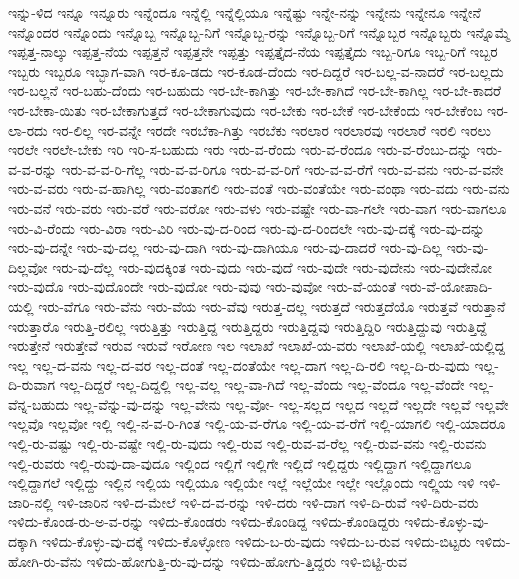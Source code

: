 {ಇನ್ನು-ಳಿದ
ಇನ್ನೂ
ಇನ್ನೂರು
ಇನ್ನೆಂದೂ
ಇನ್ನೆಲ್ಲಿ
ಇನ್ನೆಲ್ಲಿಯೂ
ಇನ್ನೆಷ್ಟು
ಇನ್ನೇ-ನನ್ನು
ಇನ್ನೇನು
ಇನ್ನೇನೂ
ಇನ್ನೇನೆ
ಇನ್ನೊಂದರ
ಇನ್ನೊಂದು
ಇನ್ನೊಬ್ಬ
ಇನ್ನೊಬ್ಬ-ನಿಗೆ
ಇನ್ನೊಬ್ಬ-ರನ್ನು
ಇನ್ನೊಬ್ಬ-ರಿಗೆ
ಇನ್ನೊಬ್ಬರ
ಇನ್ನೊಬ್ಬರು
ಇನ್ನೊಮ್ಮೆ
ಇಪ್ಪತ್ತ-ನಾಲ್ಕು
ಇಪ್ಪತ್ತ-ನೆಯ
ಇಪ್ಪತ್ತನೆ
ಇಪ್ಪತ್ತನೇ
ಇಪ್ಪತ್ತು
ಇಪ್ಪತ್ತೈದ-ನೆಯ
ಇಪ್ಪತ್ತೈದು
ಇಬ್ಬ-ರಿಗೂ
ಇಬ್ಬ-ರಿಗೆ
ಇಬ್ಬರ
ಇಬ್ಬರು
ಇಬ್ಬರೂ
ಇಬ್ಭಾಗ-ವಾಗಿ
ಇರ-ಕೂ-ಡದು
ಇರ-ಕೂಡ-ದೆಂದು
ಇರ-ದಿದ್ದರೆ
ಇರ-ಬಲ್ಲ-ವ-ನಾದರೆ
ಇರ-ಬಲ್ಲದು
ಇರ-ಬಲ್ಲನೆ
ಇರ-ಬಹು-ದೆಂದು
ಇರ-ಬಹುದು
ಇರ-ಬೇ-ಕಾಗಿತ್ತು
ಇರ-ಬೇ-ಕಾಗಿದೆ
ಇರ-ಬೇ-ಕಾಗಿಲ್ಲ
ಇರ-ಬೇ-ಕಾದರೆ
ಇರ-ಬೇಕಾ-ಯಿತು
ಇರ-ಬೇಕಾಗುತ್ತದೆ
ಇರ-ಬೇಕಾಗುವುದು
ಇರ-ಬೇಕು
ಇರ-ಬೇಕೆ
ಇರ-ಬೇಕೆಂದು
ಇರ-ಬೇಕೆಂಬ
ಇರ-ಲಾ-ರದು
ಇರ-ಲಿಲ್ಲ
ಇರ-ವನ್ನೇ
ಇರದೇ
ಇರಬೆಕಾ-ಗಿತ್ತು
ಇರಬೆಕು
ಇರಲಾರ
ಇರಲಾರವು
ಇರಲಾರೆ
ಇರಲಿ
ಇರಲು
ಇರಲೇ
ಇರಲೇ-ಬೇಕು
ಇರಿ
ಇರಿ-ಸ-ಬಹುದು
ಇರು
ಇರು-ವ-ರೆಂದು
ಇರು-ವ-ರೆಂದೂ
ಇರು-ವ-ರೆಂಬು-ದನ್ನು
ಇರು-ವ-ವ-ರನ್ನು
ಇರು-ವ-ವ-ರಿ-ಗೆಲ್ಲ
ಇರು-ವ-ವ-ರಿಗೂ
ಇರು-ವ-ವ-ರಿಗೆ
ಇರು-ವ-ವ-ರೆಗೆ
ಇರು-ವ-ವನು
ಇರು-ವ-ವನೇ
ಇರು-ವ-ವರು
ಇರು-ವ-ಹಾಗಿಲ್ಲ
ಇರು-ವಂತಾಗಲಿ
ಇರು-ವಂತೆ
ಇರು-ವಂತೆಯೇ
ಇರು-ವಂಥಾ
ಇರು-ವದು
ಇರು-ವನು
ಇರು-ವನೆ
ಇರು-ವರು
ಇರು-ವರೆ
ಇರು-ವರೋ
ಇರು-ವಳು
ಇರು-ವಷ್ಟೇ
ಇರು-ವಾ-ಗಲೇ
ಇರು-ವಾಗ
ಇರು-ವಾಗಲೂ
ಇರು-ವಿ-ರೆಂದು
ಇರು-ವಿರಾ
ಇರು-ವಿರಿ
ಇರು-ವು-ದ-ರಿಂದ
ಇರು-ವು-ದ-ರಿಂದಲೇ
ಇರು-ವು-ದಕ್ಕೆ
ಇರು-ವು-ದನ್ನು
ಇರು-ವು-ದನ್ನೇ
ಇರು-ವು-ದಲ್ಲ
ಇರು-ವು-ದಾಗಿ
ಇರು-ವು-ದಾಗಿಯೂ
ಇರು-ವು-ದಾದರೆ
ಇರು-ವು-ದಿಲ್ಲ
ಇರು-ವು-ದಿಲ್ಲವೋ
ಇರು-ವು-ದೆಲ್ಲ
ಇರು-ವುದಕ್ಕಿಂತ
ಇರು-ವುದು
ಇರು-ವುದೆ
ಇರು-ವುದೇ
ಇರು-ವುದೇನು
ಇರು-ವುದೇನೋ
ಇರು-ವುದೊ
ಇರು-ವುದೊಂದೇ
ಇರು-ವುದೋ
ಇರು-ವುವು
ಇರು-ವುವೋ
ಇರು-ವೆ-ಯಂತೆ
ಇರು-ವೆ-ಯೋಪಾದಿ-ಯಲ್ಲಿ
ಇರು-ವೆಗೂ
ಇರು-ವೆನು
ಇರು-ವೆಯ
ಇರು-ವೆವು
ಇರುತ್ತ-ದಲ್ಲ
ಇರುತ್ತದೆ
ಇರುತ್ತದೆಯೊ
ಇರುತ್ತವೆ
ಇರುತ್ತಾನೆ
ಇರುತ್ತಾರೊ
ಇರುತ್ತಿ-ರಲಿಲ್ಲ
ಇರುತ್ತಿತ್ತು
ಇರುತ್ತಿದ್ದ
ಇರುತ್ತಿದ್ದರು
ಇರುತ್ತಿದ್ದವು
ಇರುತ್ತಿದ್ದಿರಿ
ಇರುತ್ತಿದ್ದುವು
ಇರುತ್ತಿದ್ದೆ
ಇರುತ್ತೇನೆ
ಇರುತ್ತೇವೆ
ಇರುವ
ಇರುವೆ
ಇರೋಣ
ಇಲ
ಇಲಾಖೆ
ಇಲಾಖೆ-ಯ-ವರು
ಇಲಾಖೆ-ಯಲ್ಲಿ
ಇಲಾಖೆ-ಯಲ್ಲಿದ್ದ
ಇಲ್ಲ
ಇಲ್ಲ-ದ-ವನು
ಇಲ್ಲ-ದ-ವರ
ಇಲ್ಲ-ದಂತೆ
ಇಲ್ಲ-ದಂತೆಯೇ
ಇಲ್ಲ-ದಾಗ
ಇಲ್ಲ-ದಿ-ರಲಿ
ಇಲ್ಲ-ದಿ-ರು-ವುದು
ಇಲ್ಲ-ದಿ-ರುವಾಗ
ಇಲ್ಲ-ದಿದ್ದರೆ
ಇಲ್ಲ-ದಿದ್ದಲ್ಲಿ
ಇಲ್ಲ-ವಲ್ಲ
ಇಲ್ಲ-ವಾ-ಗಿದೆ
ಇಲ್ಲ-ವೆಂದು
ಇಲ್ಲ-ವೆಂದೂ
ಇಲ್ಲ-ವೆಂದೇ
ಇಲ್ಲ-ವೆನ್ನ-ಬಹುದು
ಇಲ್ಲ-ವೆನ್ನು-ವು-ದನ್ನು
ಇಲ್ಲ-ವೇನು
ಇಲ್ಲ-ವೋ-
ಇಲ್ಲ-ಸಲ್ಲದ
ಇಲ್ಲದ
ಇಲ್ಲದೆ
ಇಲ್ಲದೇ
ಇಲ್ಲವೆ
ಇಲ್ಲವೇ
ಇಲ್ಲವೊ
ಇಲ್ಲವೋ
ಇಲ್ಲಿ
ಇಲ್ಲಿ-ನ-ವ-ರಿ-ಗಿಂತ
ಇಲ್ಲಿ-ಯ-ವ-ರೆಗೂ
ಇಲ್ಲಿ-ಯ-ವ-ರೆಗೆ
ಇಲ್ಲಿ-ಯಾಗಲಿ
ಇಲ್ಲಿ-ಯಾದರೂ
ಇಲ್ಲಿ-ರು-ವಷ್ಟು
ಇಲ್ಲಿ-ರು-ವಷ್ಟೇ
ಇಲ್ಲಿ-ರು-ವುದು
ಇಲ್ಲಿ-ರುವ
ಇಲ್ಲಿ-ರುವ-ವ-ರೆಲ್ಲ
ಇಲ್ಲಿ-ರುವ-ವನು
ಇಲ್ಲಿ-ರುವನು
ಇಲ್ಲಿ-ರುವರು
ಇಲ್ಲಿ-ರುವು-ದಾ-ವುದೂ
ಇಲ್ಲಿಂದ
ಇಲ್ಲಿಗೆ
ಇಲ್ಲಿಗೇ
ಇಲ್ಲಿದೆ
ಇಲ್ಲಿದ್ದರು
ಇಲ್ಲಿದ್ದಾಗ
ಇಲ್ಲಿದ್ದಾಗಲೂ
ಇಲ್ಲಿದ್ದಾಗಲೆ
ಇಲ್ಲಿದ್ದು
ಇಲ್ಲಿನ
ಇಲ್ಲಿಯ
ಇಲ್ಲಿಯೂ
ಇಲ್ಲಿಯೇ
ಇಲ್ಲೆ
ಇಲ್ಲೆಯೇ
ಇಲ್ಲೇ
ಇಲ್ಲೊಂದು
ಇಲ್ಲ್ಲಿಯ
ಇಳಿ
ಇಳಿ-ಜಾರಿ-ನಲ್ಲಿ
ಇಳಿ-ಜಾರಿನ
ಇಳಿ-ದ-ಮೇಲೆ
ಇಳಿ-ದ-ವ-ರನ್ನು
ಇಳಿ-ದರು
ಇಳಿ-ದಾಗ
ಇಳಿ-ದಿ-ರುವೆ
ಇಳಿ-ದಿರು-ವರು
ಇಳಿದು-ಕೊಂಡ-ರು-ಅ-ವ-ರನ್ನು
ಇಳಿದು-ಕೊಂಡರು
ಇಳಿದು-ಕೊಂಡಿದ್ದ
ಇಳಿದು-ಕೊಂಡಿದ್ದರು
ಇಳಿದು-ಕೊಳ್ಳು-ವು-ದಕ್ಕಾಗಿ
ಇಳಿದು-ಕೊಳ್ಳು-ವು-ದಕ್ಕೆ
ಇಳಿದು-ಕೊಳ್ಳೋಣ
ಇಳಿದು-ಬ-ರು-ವುದು
ಇಳಿದು-ಬ-ರುವ
ಇಳಿದು-ಬಿಟ್ಟರು
ಇಳಿದು-ಹೋಗಿ-ರು-ವೆನು
ಇಳಿದು-ಹೋಗುತ್ತಿ-ರು-ವು-ದನ್ನು
ಇಳಿದು-ಹೋಗು-ತ್ತಿದ್ದರು
ಇಳಿ-ಬಿಟ್ಟಿ-ರುವ
}
